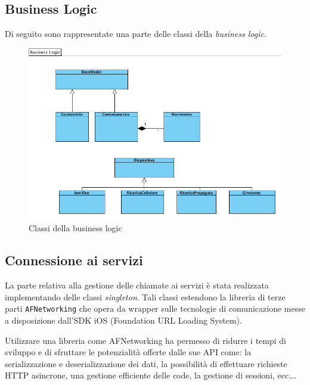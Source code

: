 \subsection{Business Logic}
Di seguito sono rappresentate una parte delle classi della \emph{business logic}.
\begin{figure}[!htbp]
\centering
\includegraphics[scale=0.60]{architettura/businessLogicClass.png}
\caption{Classi della business logic}
\label{fig:businessLogic}
\end{figure}

\subsection{Connessione ai servizi}
\label{parag:networking}
La parte relativa alla gestione delle chiamate ai servizi è stata realizzata implementando delle classi \emph{singleton}. Tali classi estendono la libreria di terze parti \texttt{AFNetworking} che opera da wrapper sulle tecnologie di comunicazione messe a disposizione dall'SDK iOS (Foundation URL Loading System). 

Utilizzare una libreria come AFNetworking ha permesso di ridurre i tempi di sviluppo e di sfruttare le potenzialità offerte dalle sue API come: la serializzazione e deserializzazione dei dati, la possibilità di effettuare richieste HTTP asincrone, una gestione efficiente delle code, la gestione di sessioni, ecc\dots.  

